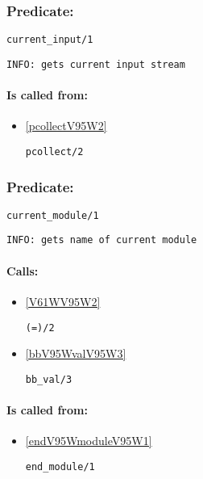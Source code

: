 \subsubsection{Predicate:} \label{currentV95WinputV95W1}

\begin{verbatim}
current_input/1
\end{verbatim}

{\small \begin{verbatim}
INFO: gets current input stream

\end{verbatim}}
\paragraph{Is called from:} 
\begin{itemize}
\item \ref{pcollectV95W2} 
\begin{verbatim}
pcollect/2
\end{verbatim}

\end{itemize}

\subsubsection{Predicate:} \label{currentV95WmoduleV95W1}

\begin{verbatim}
current_module/1
\end{verbatim}

{\small \begin{verbatim}
INFO: gets name of current module

\end{verbatim}}
\paragraph{Calls:} 
\begin{itemize}
\item \ref{V61WV95W2} 
\begin{verbatim}
(=)/2
\end{verbatim}

\item \ref{bbV95WvalV95W3} 
\begin{verbatim}
bb_val/3
\end{verbatim}

\end{itemize}
\paragraph{Is called from:} 
\begin{itemize}
\item \ref{endV95WmoduleV95W1} 
\begin{verbatim}
end_module/1
\end{verbatim}

\end{itemize}


